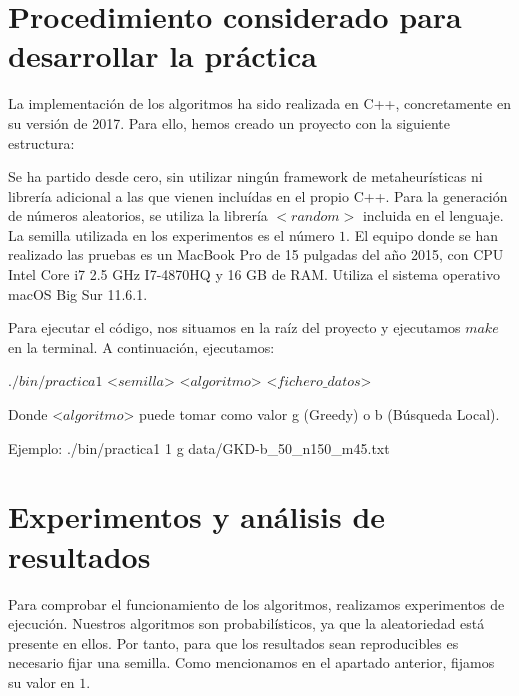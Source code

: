 \part{Procedimiento considerado para desarrollar la práctica}

La implementación de los algoritmos ha sido realizada en C++, concretamente en su versión de 2017. Para ello, hemos creado un proyecto con la siguiente estructura:


Se ha partido desde cero, sin utilizar ningún framework de metaheurísticas ni librería adicional a las que vienen incluídas en el propio C++. Para la generación de números aleatorios, se utiliza la librería $<random>$ incluida en el lenguaje. La semilla utilizada en los experimentos es el número $1$. El equipo donde se han realizado las pruebas es un MacBook Pro de 15 pulgadas del año 2015, con CPU Intel Core i7 2.5 GHz I7-4870HQ y 16 GB de RAM. Utiliza el sistema operativo macOS Big Sur 11.6.1.

Para ejecutar el código, nos situamos en la raíz del proyecto y ejecutamos $make$ en la terminal. A continuación, ejecutamos:

\noindent $./bin/practica1$ <$semilla$> \space <$algoritmo$> \space <$fichero\_datos$>

\noindent Donde <$algoritmo$> \space puede tomar como valor g (Greedy) o b (Búsqueda Local).

\noindent Ejemplo: ./bin/practica1 1 g data/GKD-b\_50\_n150\_m45.txt


\part{Experimentos y análisis de resultados}
Para comprobar el funcionamiento de los algoritmos, realizamos experimentos de ejecución. Nuestros algoritmos son probabilísticos, ya que la aleatoriedad está presente en ellos. Por tanto, para que los resultados sean reproducibles es necesario fijar una semilla. Como mencionamos en el apartado anterior, fijamos su valor en $1$. 

